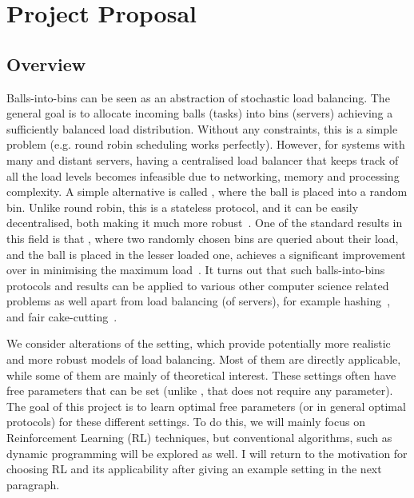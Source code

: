 \chapter{Project Proposal}\label{proposal} 

\section*{Overview}

Balls-into-bins can be seen as an abstraction of stochastic load balancing. The general goal is to allocate incoming balls (tasks) into bins (servers) achieving a sufficiently balanced load distribution. Without any constraints, this is a simple problem (e.g. round robin scheduling works  perfectly). However, for systems with many and distant servers, having a centralised load balancer that keeps track of all the load levels becomes infeasible due to networking, memory and processing complexity.  A simple alternative is called \OneChoice, where the ball is placed into a random bin. Unlike round robin, this is a stateless protocol, and it can be easily decentralised, both making it much more robust~\cite{nasir2015power}. One of the standard results in this field is that \TwoChoice, where two randomly chosen bins are queried about their load, and the ball is placed in the lesser loaded one, achieves a significant improvement over \OneChoice in minimising the maximum load~\cite{azar1999twochoice}. It turns out that such balls-into-bins protocols and results can be applied to various other computer science related problems as well apart from load balancing (of servers), for example hashing~\cite{dahlgaard2016power}, and fair cake-cutting~\cite{edmonds2006balanced}.

We consider alterations of the \TwoChoice setting, which provide potentially more realistic and more robust models of load balancing. Most of them are directly applicable, while some of them are mainly of theoretical interest. These settings often have free parameters that can be set (unlike \TwoChoice, that does not require any parameter). 
The goal of this project is to learn optimal free parameters (or in general optimal protocols) for these different settings. To do this, we will mainly focus on Reinforcement Learning (RL) techniques, but conventional algorithms, such as dynamic programming will be explored as well. I will return to the motivation for choosing RL and its applicability after giving an example setting in the next paragraph.

